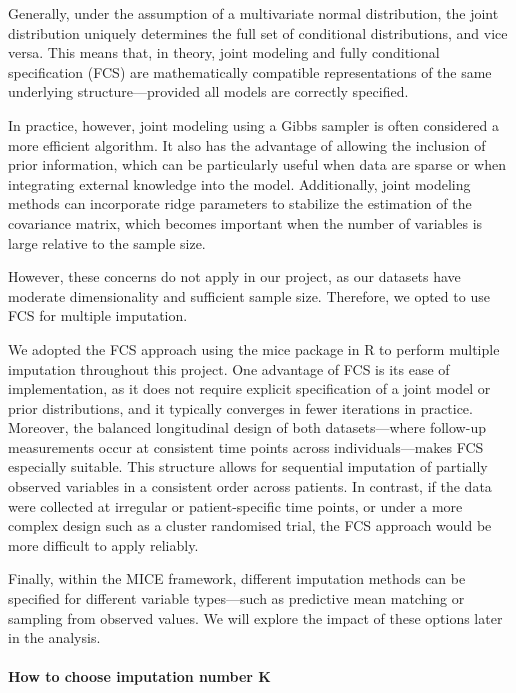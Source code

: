 \documentclass{article}
\begin{document}
Generally, under the assumption of a multivariate normal distribution,
the joint distribution uniquely determines the full set of conditional
distributions, and vice versa. This means that, in theory, joint
modeling and fully conditional specification (FCS) are mathematically
compatible representations of the same underlying structure---provided
all models are correctly specified.

In practice, however, joint modeling using a Gibbs sampler is often
considered a more efficient algorithm. It also has the advantage of
allowing the inclusion of prior information, which can be particularly
useful when data are sparse or when integrating external knowledge into
the model. Additionally, joint modeling methods can incorporate ridge
parameters to stabilize the estimation of the covariance matrix, which
becomes important when the number of variables is large relative to the
sample size.

However, these concerns do not apply in our project, as our datasets
have moderate dimensionality and sufficient sample size. Therefore, we
opted to use FCS for multiple imputation.

We adopted the FCS approach using the mice package in R to perform
multiple imputation throughout this project. One advantage of FCS is its
ease of implementation, as it does not require explicit specification of
a joint model or prior distributions, and it typically converges in
fewer iterations in practice. Moreover, the balanced longitudinal design
of both datasets---where follow-up measurements occur at consistent time
points across individuals---makes FCS especially suitable. This
structure allows for sequential imputation of partially observed
variables in a consistent order across patients. In contrast, if the
data were collected at irregular or patient-specific time points, or
under a more complex design such as a cluster randomised trial, the FCS
approach would be more difficult to apply reliably.

Finally, within the MICE framework, different imputation methods can be
specified for different variable types---such as predictive mean
matching or sampling from observed values. We will explore the impact of
these options later in the analysis.

\paragraph{How to choose imputation number
K}\label{how-to-choose-imputation-number-k}
\end{document}
